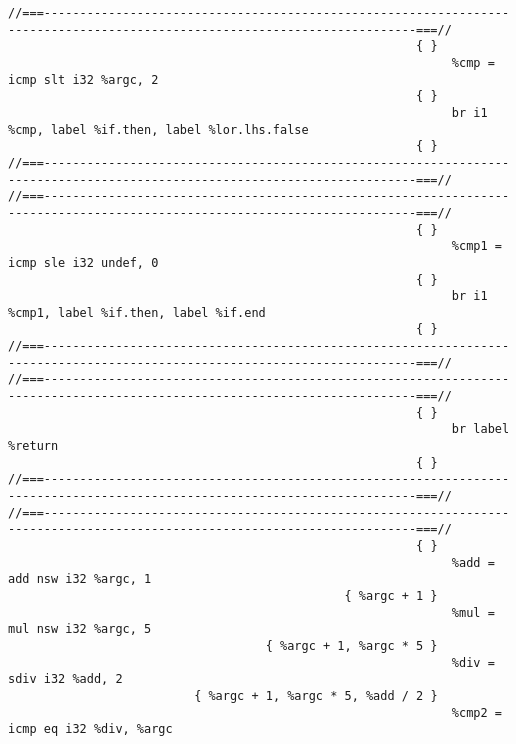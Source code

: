\begingroup
    \fontsize{6pt}{8pt}\selectfont
\begin{verbatim}
//===--------------------------------------------------------------------------------------------------------------------------===//
                                                         { }
                                                              %cmp = icmp slt i32 %argc, 2
                                                         { }
                                                              br i1 %cmp, label %if.then, label %lor.lhs.false
                                                         { }
//===--------------------------------------------------------------------------------------------------------------------------===//
//===--------------------------------------------------------------------------------------------------------------------------===//
                                                         { }
                                                              %cmp1 = icmp sle i32 undef, 0
                                                         { }
                                                              br i1 %cmp1, label %if.then, label %if.end
                                                         { }
//===--------------------------------------------------------------------------------------------------------------------------===//
//===--------------------------------------------------------------------------------------------------------------------------===//
                                                         { }
                                                              br label %return
                                                         { }
//===--------------------------------------------------------------------------------------------------------------------------===//
//===--------------------------------------------------------------------------------------------------------------------------===//
                                                         { }
                                                              %add = add nsw i32 %argc, 1
                                               { %argc + 1 }
                                                              %mul = mul nsw i32 %argc, 5
                                    { %argc + 1, %argc * 5 }
                                                              %div = sdiv i32 %add, 2
                          { %argc + 1, %argc * 5, %add / 2 }
                                                              %cmp2 = icmp eq i32 %div, %argc

\end{verbatim}
